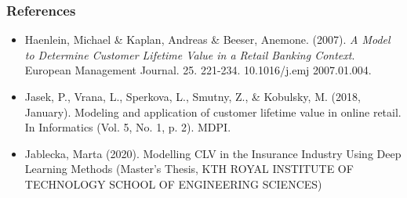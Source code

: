 \documentclass[aspectratio=169,xcolor=x11names,compress]{beamer}
\begin{document}
\begin{frame}
\frametitle{References}

\begin{itemize}
	\item Haenlein, Michael \& Kaplan, Andreas \& Beeser, Anemone. (2007). \textit{A Model to Determine Customer Lifetime Value in a Retail Banking Context}. European Management Journal. 25. 221-234. 10.1016/j.emj 2007.01.004. 
 	\item Jasek, P., Vrana, L., Sperkova, L., Smutny, Z., \& Kobulsky, M. (2018, January). Modeling and application of customer lifetime value in online retail. In Informatics (Vol. 5, No. 1, p. 2). MDPI.
  \item Jablecka, Marta (2020). Modelling CLV in the Insurance Industry Using Deep Learning Methods (Master's Thesis, KTH ROYAL INSTITUTE OF TECHNOLOGY
SCHOOL OF ENGINEERING SCIENCES)
\end{itemize}

\end{frame}
\end{document}
